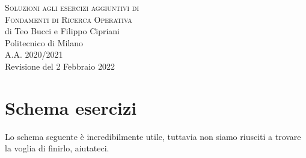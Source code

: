 \documentclass[10pt,a4paper,twoside,openright]{book}
\newcounter{es}
\numberwithin{es}{chapter}
\begin{document}
\AtEndDocument{\cleardoublepage}

\frontmatter
\pagestyle{empty}
\vspace*{\fill}
\begin{center}
	{\large \textsc{Soluzioni agli esercizi aggiuntivi di}}\\
	\vspace*{0.4cm}
	{\Huge \textsc{Fondamenti di Ricerca Operativa}}\\
	\vspace*{1cm}
	{\large {di Teo Bucci e Filippo Cipriani}}\\
	\vspace*{1cm}
	Politecnico di Milano\\A.A. 2020/2021\\
	\vspace*{1cm}
	Revisione del 2 Febbraio 2022
\end{center}
\vspace*{\fill}
\clearpage

\tableofcontents

\mainmatter
\pagestyle{fancy}





\chapter{Schema esercizi}
Lo schema seguente è incredibilmente utile, tuttavia non siamo riusciti a trovare la voglia di finirlo, aiutateci.

\end{document}
